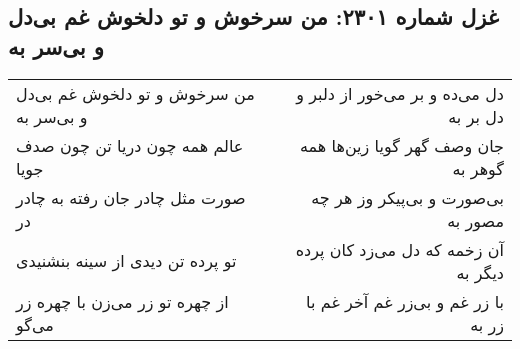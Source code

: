 \begin{center}
\section*{غزل شماره ۲۳۰۱: من سرخوش و تو دلخوش غم بی‌دل و بی‌سر به}
\label{sec:2301}
\begin{longtable}{l p{0.5cm} r}
من سرخوش و تو دلخوش غم بی‌دل و بی‌سر به
&&
دل می‌ده و بر می‌خور از دلبر و دل بر به
\\
عالم همه چون دریا تن چون صدف جویا
&&
جان وصف گهر گویا زین‌ها همه گوهر به
\\
صورت مثل چادر جان رفته به چادر در
&&
بی‌صورت و بی‌پیکر وز هر چه مصور به
\\
تو پرده تن دیدی از سینه بنشنیدی
&&
آن زخمه که دل می‌زد کان پرده دیگر به
\\
از چهره تو زر می‌زن با چهره زر می‌گو
&&
با زر غم و بی‌زر غم آخر غم با زر به
\\
\end{longtable}
\end{center}
